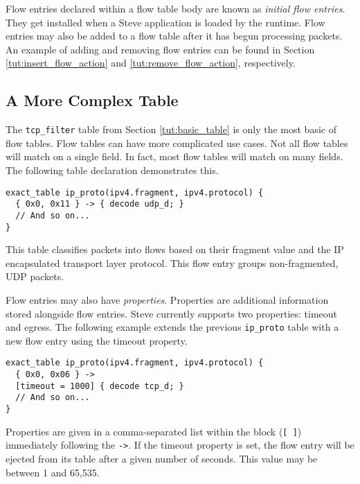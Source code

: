 Flow entries declared within a flow table body are known
as \textit{initial flow entries}. 
They get installed when a Steve application is loaded by the runtime.
Flow entries may also be added to a flow table after it has begun processing packets. 
An example of adding and removing flow entries can be found in Section \ref{tut:insert_flow_action} and \ref{tut:remove_flow_action}, respectively.

\subsection{A More Complex Table} \label{tut:complex_table}

The \texttt{tcp\_filter} table from Section \ref{tut:basic_table} is only the most basic of flow tables. 
Flow tables can have more complicated use cases.
Not all flow tables will match on a single field. In fact, most flow tables will
match on many fields. The following table declaration demonstrates this.

\begin{codepage}
\begin{lstlisting}
exact_table ip_proto(ipv4.fragment, ipv4.protocol) {
  { 0x0, 0x11 } -> { decode udp_d; }
  // And so on...
}
\end{lstlisting}
\end{codepage}

This table classifies packets into flows based on their fragment value
and the IP encapsulated transport layer protocol. This flow entry
groups non-fragmented, UDP packets.

Flow entries may also have \textit{properties}. Properties are additional
information stored alongside flow entries. 
Steve currently supports two properties: timeout and egress.
The following example extends the previous \texttt{ip\_proto} table with a new flow entry using the timeout property.

\begin{codepage}
\begin{lstlisting}
exact_table ip_proto(ipv4.fragment, ipv4.protocol) {
  { 0x0, 0x06 } ->
  [timeout = 1000] { decode tcp_d; }
  // And so on...
}
\end{lstlisting}
\end{codepage}

Properties are given in a comma-separated list within the block (\texttt{[ ]}) 
immediately following the \texttt{->}. 
If the timeout property is set, the flow entry will be ejected from its table
after a given number of seconds. This value may be between 1 and 65,535.

